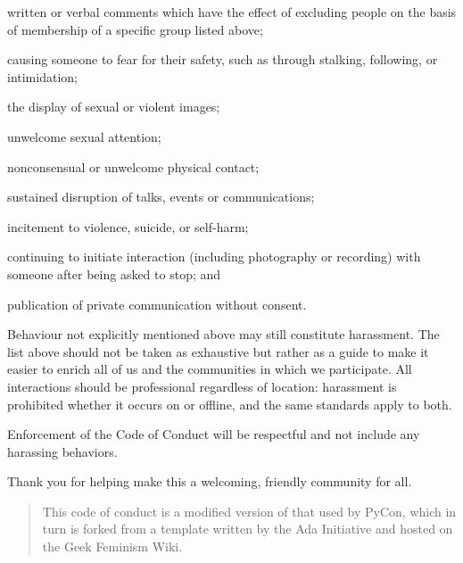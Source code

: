 \begin{gitemize}

\item
  written or verbal comments which have the effect of excluding people
  on the basis of membership of a specific group listed above;

\item
  causing someone to fear for their safety, such as through stalking,
  following, or intimidation;

\item
  the display of sexual or violent images;

\item
  unwelcome sexual attention;

\item
  nonconsensual or unwelcome physical contact;

\item
  sustained disruption of talks, events or communications;

\item
  incitement to violence, suicide, or self-harm;

\item
  continuing to initiate interaction (including photography or
  recording) with someone after being asked to stop; and

\item
  publication of private communication without consent.

\end{gitemize}

Behaviour not explicitly mentioned above may still constitute
harassment.  The list above should not be taken as exhaustive but
rather as a guide to make it easier to enrich all of us and the
communities in which we participate.  All interactions should be
professional regardless of location: harassment is prohibited whether
it occurs on or offline, and the same standards apply to both.

Enforcement of the Code of Conduct will be respectful and not include
any harassing behaviors.

Thank you for helping make this a welcoming, friendly community for
all.

\begin{quotation}

  This code of conduct is a modified version of that used by PyCon,
  which in turn is forked from a template written by the Ada
  Initiative and hosted on the Geek Feminism Wiki.

\end{quotation}
